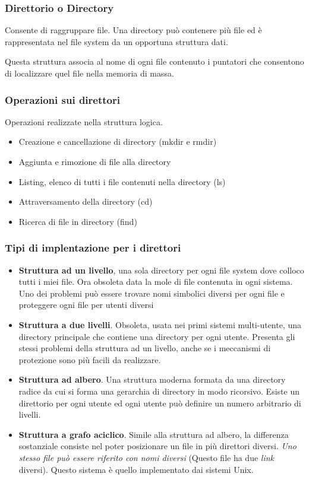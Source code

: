 \documentclass
[10pt,        %
 a4paper,     %
 onecolumn,   %
 fleqn,       %
 oneside,     %
 notitlepage, %
]{article}    %
\begin{document}
\subsubsection{Direttorio o Directory}
Consente di raggruppare file. Una directory può contenere più file ed è rappresentata nel file system da un opportuna struttura dati.

Questa struttura associa al nome di ogni file contenuto i puntatori che consentono di localizzare quel file nella memoria di massa.

\subsubsection{Operazioni sui direttori}
Operazioni realizzate nella struttura logica.
\begin{itemize}
    \item Creazione e cancellazione di directory (mkdir e rmdir)
    \item Aggiunta e rimozione di file alla directory
    \item Listing, elenco di tutti i file contenuti nella directory (ls)
    \item Attraversamento della directory (cd)
    \item Ricerca di file in directory (find)
\end{itemize}

\subsubsection{Tipi di implentazione per i direttori}
\begin{itemize}
    \item \textbf{Struttura ad un livello}, una sola directory per ogni file system dove colloco tutti i miei file. Ora obsoleta data la mole di file contenuta in ogni sistema. Uno dei problemi può essere trovare nomi simbolici diversi per ogni file e proteggere ogni file per utenti diversi
    \item \textbf{Struttura a due livelli}. Obsoleta, usata nei primi sistemi multi-utente, una directory principale che contiene una directory per ogni utente. Presenta gli stessi problemi della struttura ad un livello, anche se i meccanismi di protezione sono più facili da realizzare.
    \item \textbf{Struttura ad albero}. Una struttura moderna formata da una directory radice da cui si forma una gerarchia di directory in modo ricorsivo. Esiste un direttorio per ogni utente ed ogni utente può definire un numero arbitrario di livelli.
    \item \textbf{Struttura a grafo aciclico}. Simile alla struttura ad albero, la differenza sostanziale consiste nel poter posizionare un file in più direttori diversi. \textit{Uno stesso file può essere riferito con nomi diversi} (Questo file ha due \textit{link} diversi). Questo sistema è quello implementato dai sistemi Unix.
\end{itemize}
\end{document}
